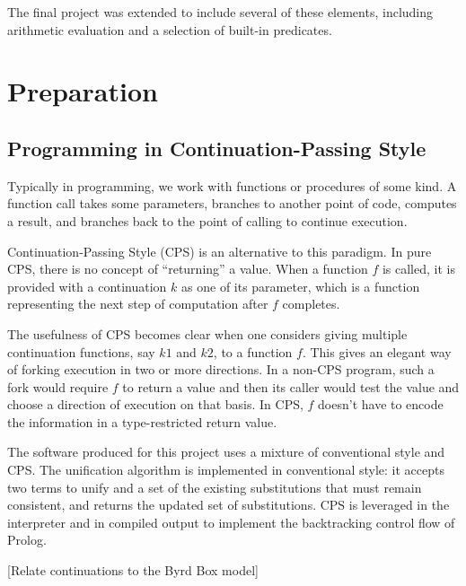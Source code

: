 \documentclass[12pt]{article}
\begin{document}
The final project was extended to include several of these elements, including arithmetic evaluation and a selection of built-in predicates.

\newpage

\section{Preparation}



\subsection{Programming in Continuation-Passing Style}

Typically in programming, we work with functions or procedures of some kind. 
A function call takes some parameters, branches to another point of code, computes a result, and branches back to the point of calling to continue execution.

Continuation-Passing Style (CPS) is an alternative to this paradigm. 
In pure CPS, there is no concept of ``returning'' a value. 
When a function $f$ is called, it is provided with a continuation $k$ as one of its parameter, which is a function representing the next step of computation after $f$ completes. 

The usefulness of CPS becomes clear when one considers giving multiple continuation functions, say $k1$ and $k2$, to a function $f$. 
This gives an elegant way of forking execution in two or more directions. 
In a non-CPS program, such a fork would require $f$ to return a value and then its caller would test the value and choose a direction of execution on that basis. 
In CPS, $f$ doesn't have to encode the information in a type-restricted return value.

The software produced for this project uses a mixture of conventional style and CPS. 
The unification algorithm is implemented in conventional style: it accepts two terms to unify and a set of the existing substitutions that must remain consistent, and returns the updated set of substitutions. 
CPS is leveraged in the interpreter and in compiled output to implement the backtracking control flow of Prolog.

[Relate continuations to the Byrd Box model]
\end{document}
